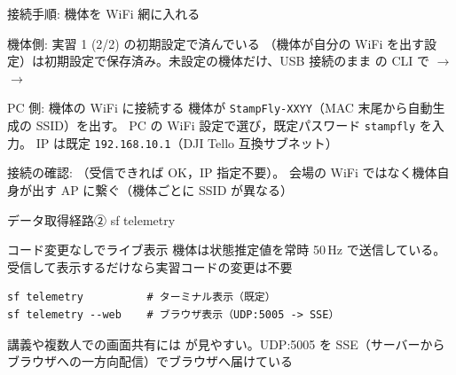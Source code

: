 \begin{frame}[fragile]{接続手順: 機体を WiFi 網に入れる}
  \begin{block}{機体側: 実習 1 (2/2) の初期設定で済んでいる}
    \footnotesize {}（機体が自分の WiFi を出す設定）は初期設定で保存済み。未設定の機体だけ、USB 接続のまま  の CLI で  $\to$  $\to$ 
  \end{block}

  \vspace{0.15em}

  \begin{exampleblock}{PC 側: 機体の WiFi に接続する}
    \footnotesize 機体が \texttt{StampFly-XXYY}（MAC 末尾から自動生成の SSID）を出す。
    PC の WiFi 設定で選び，既定パスワード \texttt{stampfly} を入力。
    IP は既定 \texttt{192.168.10.1}（DJI Tello 互換サブネット）
  \end{exampleblock}

  \vspace{0.15em}

  {\scriptsize 接続の確認: （受信できれば OK，IP 指定不要）。
  会場の WiFi ではなく機体自身が出す AP に繋ぐ（機体ごとに SSID が異なる）}
\end{frame}

\begin{frame}[fragile]{データ取得経路② sf telemetry\later}
  \begin{block}{コード変更なしでライブ表示}
    \small 機体は状態推定値を常時 50\,Hz で送信している。受信して表示するだけなら実習コードの変更は不要
  \end{block}

  \begin{lstlisting}[style=sfbash, numbers=none]
sf telemetry          # ターミナル表示（既定）
sf telemetry --web    # ブラウザ表示（UDP:5005 -> SSE）
  \end{lstlisting}

  \vspace{0.3em}

  {\small 講義や複数人での画面共有には  が見やすい。UDP:5005 を SSE（サーバーからブラウザへの一方向配信）でブラウザへ届けている}
\end{frame}

